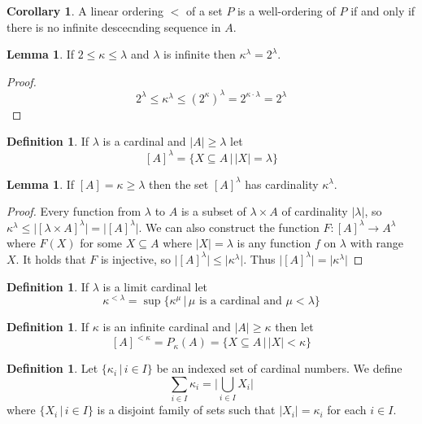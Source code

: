\documentclass{article}
\theoremstyle{definition}
\newtheorem{crly}[thm]{Corollary}
\newtheorem{defn}[thm]{Definition}
\newtheorem{lmma}[thm]{Lemma}
\newcommand{\abs}[1]{\lvert#1\rvert}
\begin{document}
\begin{crly}
    A linear ordering $<$ of a set $P$ is a well-ordering of $P$ if and only if there is no infinite descecnding sequence in $A$.
\end{crly}

\begin{lmma}
    If $2 \le \kappa \le \lambda$ and $\lambda$ is infinite then $\kappa^\lambda = 2^\lambda$.
\end{lmma}

\begin{proof}
    \[
        2^\lambda \le \kappa^\lambda \le (2^\kappa)^\lambda = 2^{\kappa \cdot \lambda} = 2^{\lambda}
    \]
\end{proof}

\begin{defn}
    If $\lambda$ is a cardinal and $\abs{A} \ge \lambda$ let 
    \[
        [A]^\lambda = \{X \subseteq A \, | \, \abs{X} = \lambda\}
    \]
\end{defn}

\begin{lmma}
    If $[A] = \kappa \ge \lambda$ then the set $[A]^\lambda$ has cardinality $\kappa^\lambda$.
\end{lmma}

\begin{proof}
    Every function from $\lambda$ to $A$ is a subset of $\lambda \times A$ of cardinality $\abs{\lambda}$, so $\kappa^\lambda \le \abs{[\lambda \times A]^\lambda}= \abs{[A]^\lambda}$. We can also construct the function $F: [A]^\lambda \to A^\lambda$ where $F(X)$ for some $X \subseteq A$ where $\abs{X} = \lambda$ is any function $f$ on $\lambda$ with range $X$. It holds that $F$ is injective, so $\abs{[A]^\lambda} \le \abs{\kappa^\lambda}$. Thus $\abs{[A]^\lambda} = \abs{\kappa^\lambda}$
\end{proof}

\begin{defn}
    If $\lambda$ is a limit cardinal let 
    \[
        \kappa^{< \lambda} = \sup \{\kappa^\mu \, | \, \mu \text{ is a cardinal and } \mu < \lambda\}
    \]
\end{defn}

\begin{defn}
    If $\kappa$ is an infinite cardinal and $\abs{A} \ge \kappa$ then let
    \[
        [A]^{< \kappa} = P_\kappa(A) = \{X \subseteq A \, | \, \abs{X} < \kappa \}
    \]
\end{defn}

\begin{defn}
    Let $\{\kappa_i \, | \, i \in I\}$ be an indexed set of cardinal numbers. We define 
    \[
        \sum_{i \in I} \kappa_i = \abs{\bigcup_{i \in I} X_i}
    \]
    where $\{X_i \, | \, i \in I\}$ is a disjoint family of sets such that $\abs{X_i} = \kappa_i$ for each $i \in I$.
\end{defn}
\end{document}
